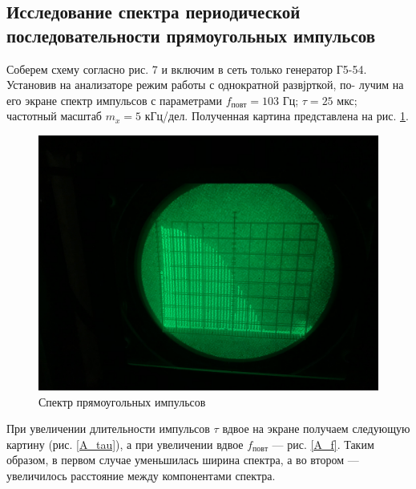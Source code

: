   	\subsection{Исследование спектра периодической последовательности прямоугольных импульсов}
  	
  	Соберем схему согласно рис. 7 и включим в сеть только генератор Г5-54.
 	Установив на анализаторе режим работы с однократной развјрткой, по-
  	лучим на его экране спектр импульсов с параметрами $ f_{повт}  = 103 $ Гц;
  $ \tau= 25 $ мкс; частотный масштаб $ m_x = 5 $ кГц/дел. Полученная картина представлена на рис. \ref{A_or}. 
  
  \begin{figure}[h]
  	\centering
  	\includegraphics[width=0.65\linewidth]{pics/A_or.jpg}
  	\caption{Спектр прямоугольных импульсов}
  	\label{A_or}
  \end{figure}
  
  При увеличении длительности импульсов $ \tau $ вдвое на экране получаем следующую картину (рис. \ref{A_tau}), а при увеличении вдвое $ f_{повт} $ --- рис. \ref{A_f}. Таким образом, в первом случае уменьшилась ширина спектра, а во втором --- увеличилось расстояние между компонентами спектра.
  
